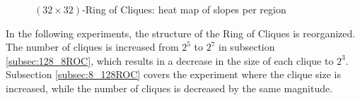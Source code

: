 \begin{figure}
    \centering
    \caption{$(32\times32)$-Ring of Cliques: heat map of slopes per region}
    \label{fig:ringOfCliquesslopes}
\end{figure}

In the following experiments, the structure of the Ring of Cliques is reorganized. The number of cliques is increased from $2^{5}$ to $2^{7}$ in subsection \ref{subsec:128_8ROC}, which results in a decrease in the size of each clique to $2^{3}$. Subsection \ref{subsec:8_128ROC} covers the experiment where the clique size is increased, while the number of cliques is decreased by the same magnitude.

